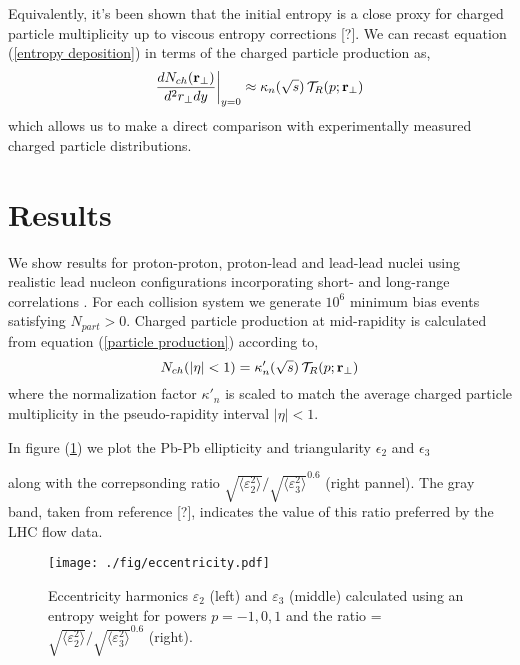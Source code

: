 \documentclass[aps,prl,reprint,amsmath,nofootinbib]{revtex4-1}
\begin{document}
Equivalently, it's been shown that the initial entropy is a close proxy for charged particle multiplicity up to viscous entropy corrections [?]. We can 
recast equation (\ref{entropy deposition}) in terms of the charged particle production as,
\begin{equation}
 \label{particle production}
 \frac{dN_{ch}({\bf r}_\perp)}{d^2r_\perp dy} \biggr \rvert_{y=0} \approx \kappa_n(\sqrt{s})\, \mathcal{T}_R(p;{\bf r}_\perp)
\end{equation}
which allows us to make a direct comparison with experimentally measured charged particle distributions.

\section{Results}

We show results for proton-proton, proton-lead and lead-lead nuclei using realistic lead nucleon configurations incorporating short- and long-range 
correlations \cite{nucleon-correlations}. For each collision system we generate $10^6$ minimum bias events satisfying $N_{part} > 0$. Charged particle
production at mid-rapidity is calculated from equation (\ref{particle production}) according to, 
\begin{equation}
 N_{ch}(|\eta|<1) = \kappa'_n(\sqrt{s})\, \mathcal{T}_R(p;{\bf r}_\perp)
\end{equation}
where the normalization factor $\kappa'_n$ is scaled to match the average charged particle multiplicity in the pseudo-rapidity interval $|\eta| < 1$.

In figure (\ref{fig:eccen}) we plot the Pb-Pb ellipticity and triangularity $\epsilon_2$ and $\epsilon_3$

along with the correpsonding ratio $\sqrt{\langle \varepsilon_2^2 \rangle}/\sqrt{\langle \varepsilon_3^2 \rangle}^{0.6}$ (right pannel). The gray band, 
taken from reference [?], indicates the value of this ratio preferred by the LHC flow data.

\begin{figure}[b]
 \texttt{[image: ./fig/eccentricity.pdf]}
  \caption{\label{fig:eccen} Eccentricity harmonics $\varepsilon_2$ (left) and $\varepsilon_3$ (middle) calculated using an entropy weight for powers $p=-1,0,1$ and
  the ratio = $\sqrt{\langle \varepsilon_2^2 \rangle}/\sqrt{\langle \varepsilon_3^2 \rangle}^{0.6}$ (right).}
\end{figure}
\end{document}
